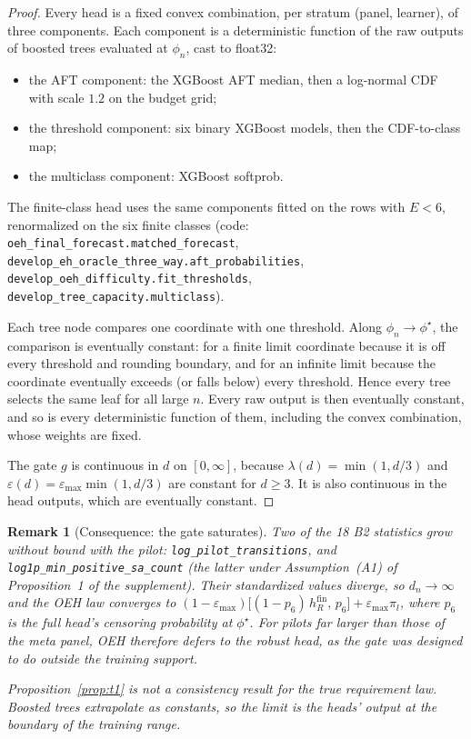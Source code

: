 \documentclass[10pt]{article}
\newtheorem{remark}{Remark}
\begin{document}
\begin{proof}
Every head is a fixed convex combination, per stratum (panel, learner), of three components. Each component is a deterministic function of the raw outputs of boosted trees evaluated at $\phi_n$, cast to float32:
\begin{itemize}
\item the AFT component: the XGBoost AFT median, then a log-normal CDF with scale $1.2$ on the budget grid;
\item the threshold component: six binary XGBoost models, then the CDF-to-class map;
\item the multiclass component: XGBoost softprob.
\end{itemize}
The finite-class head uses the same components fitted on the rows with $E<6$, renormalized on the six finite classes (code: \texttt{oeh\_final\_forecast.matched\_forecast}, \texttt{develop\_eh\_oracle\_three\_way.aft\_probabilities}, \texttt{develop\_oeh\_difficulty.fit\_thresholds}, \texttt{develop\_tree\_capacity.multiclass}).

Each tree node compares one coordinate with one threshold. Along $\phi_n\to\phi^\star$, the comparison is eventually constant: for a finite limit coordinate because it is off every threshold and rounding boundary, and for an infinite limit because the coordinate eventually exceeds (or falls below) every threshold. Hence every tree selects the same leaf for all large $n$. Every raw output is then eventually constant, and so is every deterministic function of them, including the convex combination, whose weights are fixed.

The gate $g$ is continuous in $d$ on $[0,\infty]$, because $\lambda(d)=\min(1,d/3)$ and $\varepsilon(d)=\varepsilon_{\max}\min(1,d/3)$ are constant for $d\ge3$. It is also continuous in the head outputs, which are eventually constant.
\end{proof}

\begin{remark}[Consequence: the gate saturates]
Two of the 18 B2 statistics grow without bound with the pilot: \texttt{log\_pilot\_transitions}, and \texttt{log1p\_min\_positive\_sa\_count} (the latter under Assumption~(A1) of Proposition~1 of the supplement). Their standardized values diverge, so $d_n\to\infty$ and the OEH law converges to
$(1-\varepsilon_{\max})\bigl[(1-p_6)\,h_R^{\mathrm{fin}},\,p_6\bigr]+\varepsilon_{\max}\pi_l$,
where $p_6$ is the full head's censoring probability at $\phi^\star$. For pilots far larger than those of the meta panel, OEH therefore defers to the robust head, as the gate was designed to do outside the training support.

Proposition~\ref{prop:t1} is \emph{not} a consistency result for the true requirement law. Boosted trees extrapolate as constants, so the limit is the heads' output at the boundary of the training range.
\end{remark}
\end{document}
